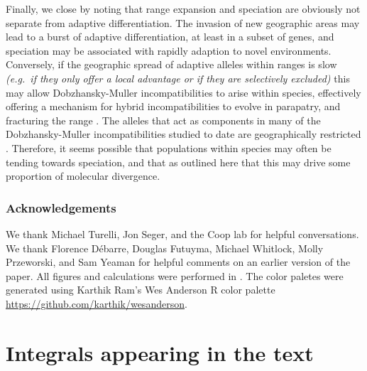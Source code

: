 \documentclass{article}
\newcommand{\mfp}[1]{{\it\color{red} #1} }
\begin{document}
Finally, we close by noting that range expansion and speciation 
are obviously not separate from adaptive differentiation. 
The invasion of new geographic areas may lead to a burst of adaptive differentiation, 
at least in a subset of genes, and speciation may be associated with rapidly adaption to novel environments. 
Conversely, if the geographic spread of adaptive alleles within ranges is slow 
\mfp{(e.g.\ if they only offer a local advantage or if they are selectively excluded)} 
this may allow Dobzhansky-Muller incompatibilities to arise within species, 
effectively offering a mechanism for hybrid incompatibilities to evolve in parapatry,
and fracturing the range \citep{Bank:12,Kondrashov:03,bierne2011coupling}. 
The alleles that act as components in many of the Dobzhansky-Muller incompatibilities studied to date 
are geographically restricted \citep[see][]{Cutter:12}. 
Therefore, it seems possible that populations within species may often be tending towards speciation, 
and that as outlined here that this may drive some proportion of molecular divergence.

\subsubsection*{Acknowledgements}
We thank Michael Turelli, Jon Seger, and the Coop lab for helpful
conversations. We thank Florence D\'ebarre, Douglas Futuyma, Michael   %
Whitlock, Molly Przeworski, and  Sam Yeaman for helpful comments on an
earlier version of the paper. All figures and calculations were
performed in \citet{R_stats}. The color paletes were generated using
Karthik Ram's Wes Anderson R color palette \url{https://github.com/karthik/wesanderson}.



\appendix

\section{Integrals appearing in the text}
    \label{apx:integrals}
\end{document}
